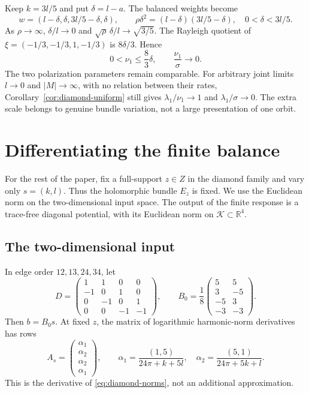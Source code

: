 \documentclass[11pt]{amsart}
\theoremstyle{definition}
\theoremstyle{remark}
\newcommand{\RR}{\mathbb R}
\newcommand{\cK}{\mathcal K}
\begin{document}
Keep $k=3l/5$ and put $\delta=l-a$. The balanced weights become
\begin{equation}\label{eq:weak-weights}
 w=(l-\delta,\delta,3l/5-\delta,\delta),\qquad
 \rho\delta^2=(l-\delta)(3l/5-\delta),\quad 0<\delta<3l/5.
\end{equation}
As $\rho\to\infty$, $\delta/l\to0$ and
$\sqrt\rho\,\delta/l\to\sqrt{3/5}$. The Rayleigh quotient of
$\xi=(-1/3,-1/3,1,-1/3)$ is $8\delta/3$. Hence
\[
 0<\nu_1\le\frac83\delta,\qquad \frac{\nu_1}{\sigma}\longrightarrow0.
\]
The two polarization parameters remain comparable. For arbitrary joint
limits $l\to0$ and $|M|\to\infty$, with no relation between their rates,
Corollary~\ref{cor:diamond-uniform} still gives
$\lambda_1/\nu_1\to1$ and $\lambda_1/\sigma\to0$. The extra scale
belongs to genuine bundle variation, not a large presentation of one orbit.

\section{Differentiating the finite balance}\label{sec:finite-response}

For the rest of the paper, fix a full-support $z\in Z$ in the diamond
family and vary only $s=(k,l)$. Thus the holomorphic bundle $E_z$ is
fixed. We use the Euclidean norm on the two-dimensional input space.
The output of the finite response is a trace-free diagonal potential,
with its Euclidean norm on $\cK\subset\RR^4$.

\subsection{The two-dimensional input}
In edge order $12,13,24,34$, let
\begin{equation}\label{eq:response-matrices}
 D=\begin{pmatrix}1&1&0&0\\-1&0&1&0\\0&-1&0&1\\0&0&-1&-1\end{pmatrix},
 \qquad
 B_0=\frac18\begin{pmatrix}5&5\\3&-5\\-5&3\\-3&-3\end{pmatrix}.
\end{equation}
Then $b=B_0s$. At fixed $z$, the matrix of logarithmic harmonic-norm
derivatives has rows
\begin{equation}\label{eq:harmonic-response}
 A_s=\begin{pmatrix}\alpha_1\\\alpha_2\\\alpha_2\\\alpha_1\end{pmatrix},
 \qquad
 \alpha_1=\frac{(1,5)}{24\pi+k+5l},\quad
 \alpha_2=\frac{(5,1)}{24\pi+5k+l}.
\end{equation}
This is the derivative of \eqref{eq:diamond-norms}, not an additional
approximation.
\end{document}
